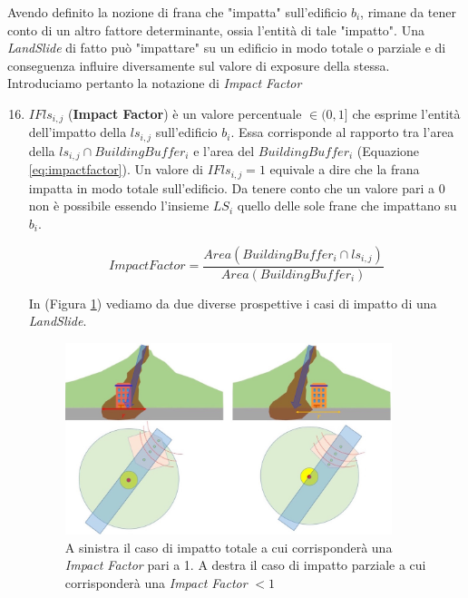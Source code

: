 Avendo definito la nozione di frana che "impatta" sull'edificio $b_i$, rimane da tener conto di un altro fattore determinante, ossia l'entità di tale "impatto". Una \textit{LandSlide} di fatto può "impattare" su un edificio in modo totale o parziale e di conseguenza influire diversamente sul valore di exposure della stessa. Introduciamo pertanto la notazione di \textit{Impact Factor}

\begin{enumerate}
	\setcounter{enumi}{15}
	
	\item \textbf{$IFls_{i,j}$} (\textbf{Impact Factor}) è un valore percentuale $\in(0,1]$ che esprime l'entità dell'impatto della $ls_{i,j}$ sull'edificio $b_i$. Essa corrisponde al rapporto tra l'area della $ls_{i,j} \cap BuildingBuffer_i$ e l'area del $BuildingBuffer_i$ (Equazione \ref{eq:impactfactor}). Un valore di $IFls_{i,j}=1$ equivale a dire che la frana impatta in modo totale sull'edificio. Da tenere conto che un valore pari a 0 non è possibile essendo l'insieme $LS_{i}$ quello delle sole frane che impattano su $b_i$.
	
	\begin{equation}\label{eq:impactfactor}
	ImpactFactor=\frac{Area(BuildingBuffer_i \cap ls_{i,j})}{Area(BuildingBuffer_i)}
	\end{equation}
	
	In (Figura \ref{impact_factor}) vediamo da due diverse prospettive i casi di impatto di una \textit{LandSlide}.
	
	\begin{figure}[h]
		\centering
		\includegraphics[width=0.9\textwidth]{images/landslide5}
		\caption{A sinistra il caso di impatto totale a cui corrisponderà una \textit{Impact Factor} pari a 1. A destra il caso di impatto parziale a cui corrisponderà una \textit{Impact Factor} $<1$  }
		\label{impact_factor}
	\end{figure}
	
\end{enumerate}

